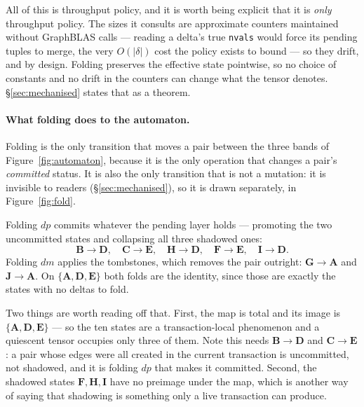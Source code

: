 \documentclass[11pt,a4paper]{article}
\theoremstyle{plain}
\theoremstyle{definition}
\theoremstyle{remark}
\begin{document}
All of this is throughput policy, and it is worth being explicit that it is
\emph{only} throughput policy. The sizes it consults are approximate counters
maintained without GraphBLAS calls --- reading a delta's true \texttt{nvals}
would force its pending tuples to merge, the very $O(|\delta|)$ cost the policy
exists to bound --- so they drift, and by design. Folding preserves the
effective state pointwise, so no choice of constants and no drift in the
counters can change what the tensor denotes. \S\ref{sec:mechanised} states
that as a theorem.

\paragraph{What folding does to the automaton.} Folding is the only transition
that moves a pair between the three bands of Figure~\ref{fig:automaton}, because
it is the only operation that changes a pair's \emph{committed} status. It is
also the only transition that is not a mutation: it is invisible to readers
(\S\ref{sec:mechanised}), so it is drawn separately, in
Figure~\ref{fig:fold}.

Folding $dp$ commits whatever the pending layer holds --- promoting the two
uncommitted states and collapsing all three shadowed ones:
\[
  \mathbf{B} \to \mathbf{D}, \quad
  \mathbf{C} \to \mathbf{E}, \quad
  \mathbf{H} \to \mathbf{D}, \quad
  \mathbf{F} \to \mathbf{E}, \quad
  \mathbf{I} \to \mathbf{D} .
\]
Folding $dm$ applies the tombstones, which removes the pair outright:
$\mathbf{G} \to \mathbf{A}$ and $\mathbf{J} \to \mathbf{A}$. On
$\{\mathbf{A}, \mathbf{D}, \mathbf{E}\}$ both folds are the identity, since
those are exactly the states with no deltas to fold.

Two things are worth reading off that. First, the map is total and its image is
$\{\mathbf{A}, \mathbf{D}, \mathbf{E}\}$ --- so the ten states are a
transaction-local phenomenon and a quiescent tensor occupies only three of them.
Note this needs $\mathbf{B} \to \mathbf{D}$ and $\mathbf{C} \to \mathbf{E}$: a
pair whose edges were all created in the current transaction is uncommitted, not
shadowed, and it is folding $dp$ that makes it committed. Second, the shadowed
states $\mathbf{F}, \mathbf{H}, \mathbf{I}$ have no preimage under the map, which
is another way of saying that shadowing is something only a live transaction can
produce.
\end{document}
